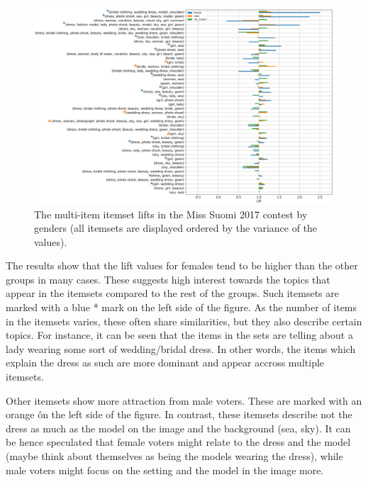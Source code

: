 \begin{figure}[]
    \begin{center}
        \includegraphics[width=1.2\textwidth,center]{Images/itemset_lifts-gender-Miss_Suomi-multi_itemsets+markup.png}
        \caption{The multi-item itemset lifts in the Miss Suomi 2017 contest by genders (all itemsets are displayed ordered by the variance of the values).}
        \label{itemset_lifts-gender-Miss_Suomi-multi_itemsets}
    \end{center}
\end{figure}

The results show that the lift values for females tend to be higher than the other groups in many cases. These suggests high interest towards the topics that appear in the itemsets compared to the rest of the groups. Such itemsets are marked with a blue * mark on the left side of the figure. As the number of items in the itemsets varies, these often share similarities, but they also describe certain topics. For instance, it can be seen that the items in the sets are telling about a lady wearing some sort of wedding/bridal dress. In other words, the items which explain the dress as such are more dominant and appear accross multiple itemsets. 

Other itemsets show more attraction from male voters. These are marked with an orange \^ on the left side of the figure. In contrast, these itemsets describe not the dress as much as the model on the image and the background (sea, sky). It can be hence speculated that female voters might relate to the dress and the model (maybe think about themselves as being the models wearing the dress), while male voters might focus on the setting and the model in the image more.


